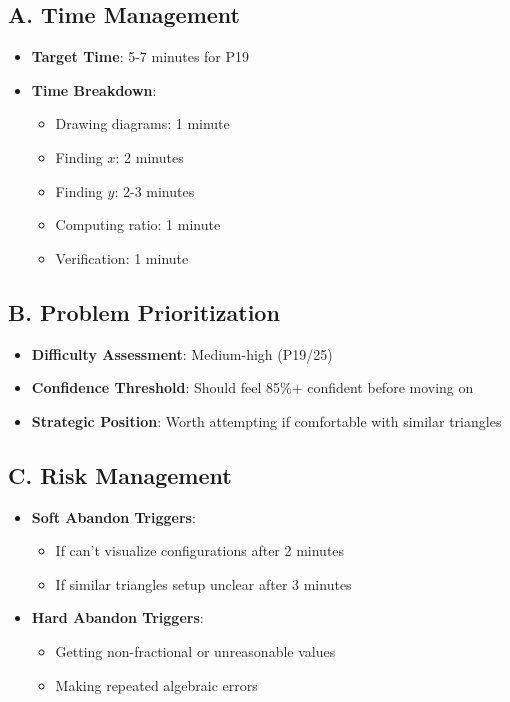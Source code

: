 \documentclass[]{article}
\begin{document}
\begin{competitionbox}
\subsection*{A. Time Management}
\begin{itemize}[leftmargin=*]
    \item \textbf{Target Time}: 5-7 minutes for P19
    \item \textbf{Time Breakdown}:
    \begin{itemize}
        \item Drawing diagrams: 1 minute
        \item Finding $x$: 2 minutes
        \item Finding $y$: 2-3 minutes
        \item Computing ratio: 1 minute
        \item Verification: 1 minute
    \end{itemize}
\end{itemize}

\subsection*{B. Problem Prioritization}
\begin{itemize}[leftmargin=*]
    \item \textbf{Difficulty Assessment}: Medium-high (P19/25)
    \item \textbf{Confidence Threshold}: Should feel 85\%+ confident before moving on
    \item \textbf{Strategic Position}: Worth attempting if comfortable with similar triangles
\end{itemize}

\subsection*{C. Risk Management}
\begin{itemize}[leftmargin=*]
    \item \textbf{Soft Abandon Triggers}:
    \begin{itemize}
        \item If can't visualize configurations after 2 minutes
        \item If similar triangles setup unclear after 3 minutes
    \end{itemize}
    \item \textbf{Hard Abandon Triggers}:
    \begin{itemize}
        \item Getting non-fractional or unreasonable values
        \item Making repeated algebraic errors
    \end{itemize}
\end{itemize}


\end{competitionbox}
\end{document}
